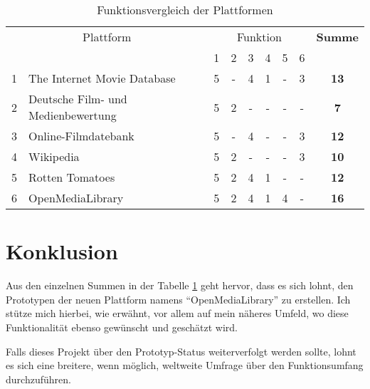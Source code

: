 \begin{table}[h]
\begin{center}
    \begin{tabular}{llccccccc}
        \toprule
        \multicolumn{2}{c}{Plattform} & \multicolumn{6}{c}{Funktion} & \textbf{Summe} \\
        \multicolumn{2}{c}{} & 1 & 2 & 3 & 4 & 5 & 6 & \\ 
        \midrule 1 & The Internet Movie Database & 5 & - & 4 & 1 & - & 3 & \textbf{13} \\
        \midrule 2 & Deutsche Film- und Medienbewertung & 5 & 2 & - & - & - & - & \textbf{7} \\ 
        \midrule 3 & Online-Filmdatebank & 5 & - & 4 & - & - & 3 & \textbf{12} \\ 
        \midrule 4 & Wikipedia & 5 & 2 & - & - & - & 3 & \textbf{10} \\ 
        \midrule 5 & Rotten Tomatoes & 5 & 2 & 4 & 1 & - & - & \textbf{12} \\ 
        \midrule 6 & OpenMediaLibrary & 5 & 2 & 4 & 1 & 4 & - & \textbf{16} \\ 
        \bottomrule
    \end{tabular}
    \caption{Funktionsvergleich der Plattformen}
    \label{tab:funktionen_vergleich}
\end{center}
\end{table}

\section{Konklusion}
Aus den einzelnen Summen in der Tabelle \ref{tab:funktionen_vergleich} geht hervor,
dass es sich lohnt, den Prototypen der neuen Plattform namens ``OpenMediaLibrary'' zu erstellen. 
Ich stütze mich hierbei, wie erwähnt, vor allem auf mein näheres Umfeld, wo diese Funktionalität 
ebenso gewünscht und geschätzt wird.

Falls dieses Projekt über den Prototyp-Status weiterverfolgt werden sollte, lohnt
es sich eine breitere, wenn möglich, weltweite Umfrage über den Funktionsumfang
durchzuführen.